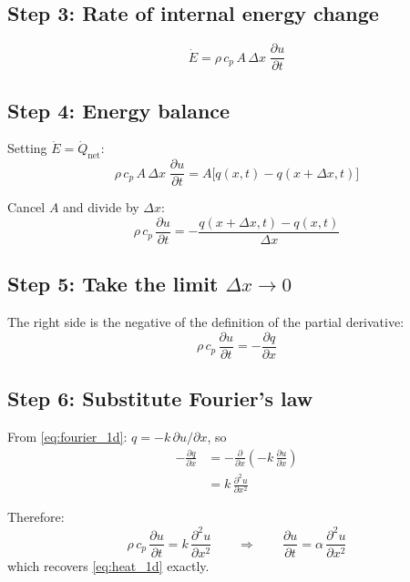 \documentclass[11pt]{article}
\newcommand{\pd}[2]{\frac{\partial #1}{\partial #2}}
\newcommand{\pdd}[2]{\frac{\partial^2 #1}{\partial #2^2}}
\begin{document}
\subsection{Step 3: Rate of internal energy change}

\begin{equation}
  \dot{E} = \rho\, c_p\, A\,\Delta x\;\pd{u}{t}
\end{equation}

\subsection{Step 4: Energy balance}

Setting $\dot{E} = \dot{Q}_{\text{net}}$:
\begin{equation}
  \rho\, c_p\, A\,\Delta x\;\pd{u}{t}
  = A\bigl[q(x,t) - q(x+\Delta x,t)\bigr]
\end{equation}

Cancel $A$ and divide by $\Delta x$:
\begin{equation}
  \rho\, c_p\,\pd{u}{t}
  = -\frac{q(x+\Delta x,t) - q(x,t)}{\Delta x}
\end{equation}

\subsection{Step 5: Take the limit $\Delta x \to 0$}

The right side is the negative of the definition of the partial derivative:
\begin{equation}
  \rho\, c_p\,\pd{u}{t} = -\pd{q}{x}
  \label{eq:1d_cons}
\end{equation}

\subsection{Step 6: Substitute Fourier's law}

From \eqref{eq:fourier_1d}: $q = -k\,\partial u / \partial x$, so
\begin{align}
  -\pd{q}{x} &= -\pd{}{x}\!\left(-k\,\pd{u}{x}\right) \\[6pt]
              &= k\,\pdd{u}{x}
\end{align}

Therefore:
\begin{equation}
  \rho\, c_p\,\pd{u}{t} = k\,\pdd{u}{x}
  \qquad\Longrightarrow\qquad
  \boxed{\pd{u}{t} = \alpha\,\pdd{u}{x}}
\end{equation}
which recovers \eqref{eq:heat_1d} exactly.
\end{document}
